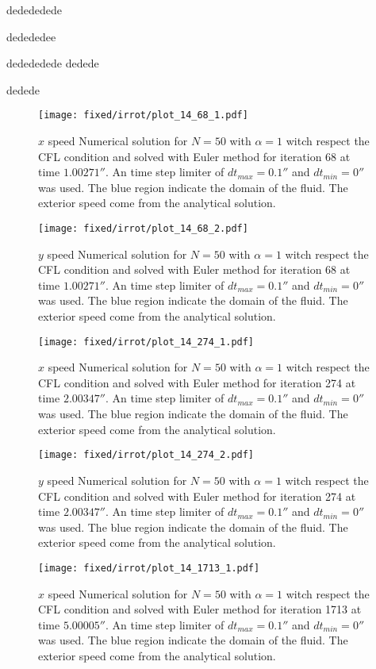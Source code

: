  dedededede 
 
 dedededee
 
 dedededede
 dedede
 
 dedede
 
 
\begin{figure}
\texttt{[image: fixed/irrot/plot\_14\_68\_1.pdf]}
\caption{$x$ speed Numerical solution for $N=50$ with $\alpha=1$ witch respect the CFL condition and solved with Euler method
for iteration 68 at time $\unit{1.00271}{\second}$.
An time step limiter of $dt_{max}=\unit{0.1}{\second}$ and $dt_{min}=\unit{0}{\second}$ was used.
The blue region indicate the domain of the fluid. The exterior speed come from the analytical solution.
}
\end{figure}
\begin{figure}
\texttt{[image: fixed/irrot/plot\_14\_68\_2.pdf]}
\caption{$y$ speed Numerical solution for $N=50$ with $\alpha=1$ witch respect the CFL condition and solved with Euler method
for iteration 68 at time $\unit{1.00271}{\second}$.
An time step limiter of $dt_{max}=\unit{0.1}{\second}$ and $dt_{min}=\unit{0}{\second}$ was used.
The blue region indicate the domain of the fluid. The exterior speed come from the analytical solution.
}
\end{figure}
\begin{figure}
\texttt{[image: fixed/irrot/plot\_14\_274\_1.pdf]}
\caption{$x$ speed Numerical solution for $N=50$ with $\alpha=1$ witch respect the CFL condition and solved with Euler method
for iteration 274 at time $\unit{2.00347}{\second}$.
An time step limiter of $dt_{max}=\unit{0.1}{\second}$ and $dt_{min}=\unit{0}{\second}$ was used.
The blue region indicate the domain of the fluid. The exterior speed come from the analytical solution.
}
\end{figure}
\begin{figure}
\texttt{[image: fixed/irrot/plot\_14\_274\_2.pdf]}
\caption{$y$ speed Numerical solution for $N=50$ with $\alpha=1$ witch respect the CFL condition and solved with Euler method
for iteration 274 at time $\unit{2.00347}{\second}$.
An time step limiter of $dt_{max}=\unit{0.1}{\second}$ and $dt_{min}=\unit{0}{\second}$ was used.
The blue region indicate the domain of the fluid. The exterior speed come from the analytical solution.
}
\end{figure}
\begin{figure}
\texttt{[image: fixed/irrot/plot\_14\_1713\_1.pdf]}
\caption{$x$ speed Numerical solution for $N=50$ with $\alpha=1$ witch respect the CFL condition and solved with Euler method
for iteration 1713 at time $\unit{5.00005}{\second}$.
An time step limiter of $dt_{max}=\unit{0.1}{\second}$ and $dt_{min}=\unit{0}{\second}$ was used.
The blue region indicate the domain of the fluid. The exterior speed come from the analytical solution.
}
\end{figure}
